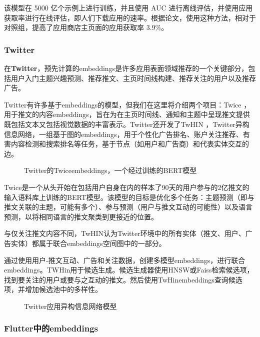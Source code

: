 \documentclass[Chinese, 11pt, table]{diazessay} %
\begin{document}
\begin{CJK}{UTF8}{gbsn}
\begin{sloppypar}
该模型在 5000 亿个示例上进行训练，并且使用 AUC 进行离线评估，并使用应用获取率进行在线评估，即人们下载应用的速率。根据论文，使用这种方法，相对于对照组，提高了应用商店主页面的应用获取率 3.9\%。

\subsubsection{Twitter}
在\textbf{Twitter}，预先计算的embeddings是许多应用表面领域推荐的一个关键部分，包括用户入门主题兴趣预测、推荐推文、主页时间线构建、推荐关注的用户以及推荐广告。

Twitter有许多基于embeddings的模型，但我们在这里将介绍两个项目：Twice \citep{liu2022twice}，用于推文的内容embeddings，旨在为在主页时间线、通知和主题中呈现推文提供既包括文本又包括视觉数据的丰富表示。Twitter还开发了TwHIN \citep{el2022twhin}，Twitter异构信息网络，一组基于图的embeddings，用于个性化广告排名、账户关注推荐、有害内容检测和搜索排名等任务，基于节点（如用户和广告商）和代表实体交互的边。

\begin{figure}[H]
\caption{Twitter的Twiceembeddings，一个经过训练的BERT模型 \citep{liu2022twice}}
\end{figure}

Twice是一个从头开始在包括用户自身在内的样本了90天的用户参与的2亿推文的输入语料库上训练的BERT模型。该模型的目标是优化多个任务：主题预测（即与推文关联的主题，可能有多个）、参与预测（用户与推文互动的可能性）以及语言预测，以将相同语言的推文聚类到更接近的位置。

与仅关注推文内容不同，TwHIN认为Twitter环境中的所有实体（推文、用户、广告实体）都属于联合embeddings空间图中的一部分。

通过使用用户-推文互动、广告和关注数据，创建多模型embeddings，进行联合embeddings。TWHin用于候选生成。候选生成器使用HNSW或Faiss检索候选项，找到要关注的用户或要与之互动的推文。然后使用TwHinembeddings查询候选项，并增加候选池中的多样性。

\begin{figure}[H]
\caption{Twitter应用异构信息网络模型 \citep{el2022twhin}}
\end{figure}

\subsubsection*{Flutter中的embeddings}


\end{sloppypar}
\end{CJK}
\end{document}

